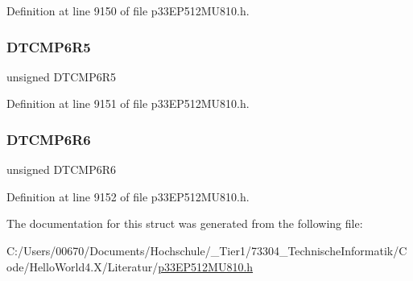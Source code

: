 Definition at line 9150 of file p33\+E\+P512\+M\+U810.\+h.

\mbox{\label{structtag_r_p_i_n_r41_b_i_t_s_a21e07052c30d06a9a58decbc0e64e416}} 
\subsubsection{\texorpdfstring{D\+T\+C\+M\+P6\+R5}{DTCMP6R5}}
{\footnotesize\ttfamily unsigned D\+T\+C\+M\+P6\+R5}



Definition at line 9151 of file p33\+E\+P512\+M\+U810.\+h.

\mbox{\label{structtag_r_p_i_n_r41_b_i_t_s_a3238cc03cbeb2f14151cd2be6e2f8b7c}} 
\subsubsection{\texorpdfstring{D\+T\+C\+M\+P6\+R6}{DTCMP6R6}}
{\footnotesize\ttfamily unsigned D\+T\+C\+M\+P6\+R6}



Definition at line 9152 of file p33\+E\+P512\+M\+U810.\+h.



The documentation for this struct was generated from the following file\+:\begin{DoxyCompactItemize}
\item 
C\+:/\+Users/00670/\+Documents/\+Hochschule/\+\_\+\+Tier1/73304\+\_\+\+Technische\+Informatik/\+Code/\+Hello\+World4.\+X/\+Literatur/\hyperlink{p33_e_p512_m_u810_8h}{p33\+E\+P512\+M\+U810.\+h}\end{DoxyCompactItemize}
